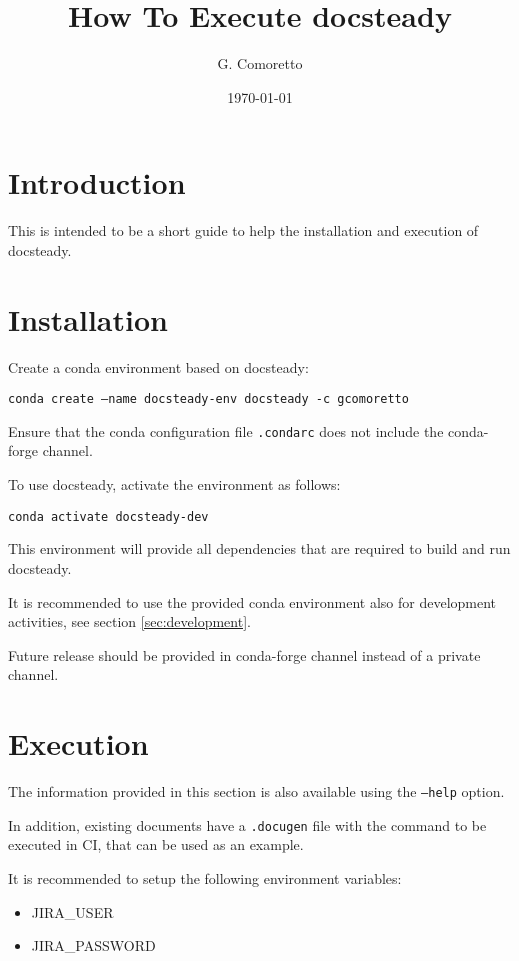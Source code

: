 \documentclass[DM]{lsstdoc}
\author{G. Comoretto}
\begin{document}
\date{\today}

\title{How To Execute docsteady}
\mkshorttitle

\section{Introduction}

This is intended to be a short guide to help the installation and  execution of docsteady.


\section{Installation}\label{sec:install}

Create a conda environment based on docsteady:

\texttt{conda create --name docsteady-env docsteady -c gcomoretto}

Ensure that the conda configuration file  \texttt{.condarc} does not include the conda-forge channel.

To use docsteady, activate the environment as follows:

\texttt{conda activate docsteady-dev}

This environment will provide all dependencies that are required to build and run docsteady.

It is recommended to use the provided conda environment also for development activities, see section \ref{sec:development}.

Future release should be provided in conda-forge channel instead of a private channel.



\section{Execution}

The information provided in this section is also available using the \texttt{--help} option.

In addition, existing documents have a \texttt{.docugen} file with the command to be executed in CI, that can be used as an example.

It is recommended to setup the following environment variables:

\begin{itemize}
\item JIRA\_USER
\item JIRA\_PASSWORD
\end{itemize}
\end{document}
